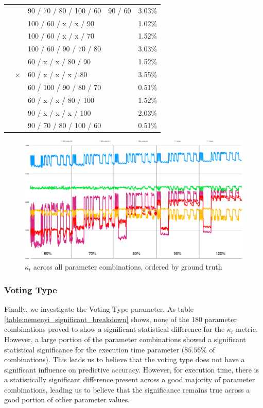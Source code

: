 \begin{table}[]
\begin{tabular}{|l|c|l|c|c|}
 &  & 90 / 70 / 80 / 100 / 60 & 90 / 60 & 3.03\% \\ \cline{2-5} 
 & \multirow{9}{*}{$\times$} & 100 / 60 / x / x / 90 & \multirow{9}{*}{} & 1.02\% \\ \cline{3-3} \cline{5-5} 
 &  & 100 / 60 / x / x / 70 &  & 1.52\% \\ \cline{3-3} \cline{5-5} 
 &  & 100 / 60 / 90 / 70 / 80 &  & 3.03\% \\ \cline{3-3} \cline{5-5} 
 &  & 60 / x / x / 80 / 90 &  & 1.52\% \\ \cline{3-3} \cline{5-5} 
 &  & 60 / x / x / x / 80 &  & 3.55\% \\ \cline{3-3} \cline{5-5} 
 &  & 60 / 100 / 90 / 80 / 70 &  & 0.51\% \\ \cline{3-3} \cline{5-5} 
 &  & 60 / x / x / 80 / 100 &  & 1.52\% \\ \cline{3-3} \cline{5-5} 
 &  & 90 / x / x / x / 100 &  & 2.03\% \\ \cline{3-3} \cline{5-5} 
 &  & 90 / 70 / 80 / 100 / 60 &  & 0.51\% \\ \hline
\end{tabular}
\end{table}

\begin{figure}
  \includegraphics[width=\linewidth]{./images/chapter5/ground_truth}
\caption{\label{fig:order_by_ground_truth}$\kappa_t$ across all parameter combinations, ordered by ground truth}
\end{figure}

\subsubsection{Voting Type}

Finally, we investigate the Voting Type parameter. As table \ref{table:nemenyi_significant_breakdown} shows, none of the 180 parameter combinations proved to show a significant statistical difference for the $\kappa_t$ metric. However, a large portion of the parameter combinations showed a significant statistical significance for the execution time parameter ($85.56\%$ of combinations). This leads us to believe that the voting type does not have a significant influence on predictive accuracy. However, for execution time, there is a statistically significant difference present across a good majority of parameter combinations, leading us to believe that the significance remains true across a good portion of other parameter values.

